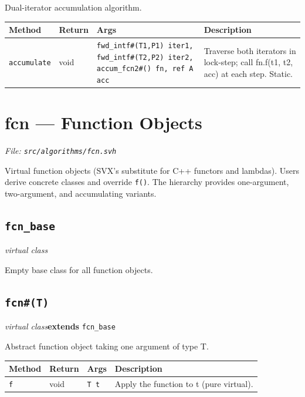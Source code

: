 \documentclass[11pt,letterpaper]{report}
\begin{document}
Dual-iterator accumulation algorithm.

\begin{xltabular}{\linewidth}{>{\small}p{1.35in} >{\small}p{1.25in} >{\small}p{0.95in} >{\small}X}
\toprule
\textbf{Method} & \textbf{Return} & \textbf{Args} & \textbf{Description} \\
\midrule
\endhead
\bottomrule
\endfoot
\texttt{accumulate} & void & \texttt{fwd\_intf\#(T1,P1) iter1, fwd\_intf\#(T2,P2) iter2, accum\_fcn2\#() fn, ref A acc} & Traverse both iterators in lock-step; call fn.f(t1, t2, acc) at each step. Static. \\
\end{xltabular}

\section{fcn --- Function Objects}
\noindent\small\textit{File: \texttt{src/algorithms/fcn.svh}}\par

Virtual function objects (SVX's substitute for C++ functors and lambdas). Users derive concrete classes and override \texttt{f()}. The hierarchy provides one-argument, two-argument, and accumulating variants.

\subsection*{\texttt{fcn\_base}}
\noindent\small\textit{virtual class}\par

Empty base class for all function objects.


\subsection*{\texttt{fcn\#(T)}}
\noindent\small\textit{virtual class}\quad \textbf{extends} \texttt{fcn\_base}\par

Abstract function object taking one argument of type T.

\begin{xltabular}{\linewidth}{>{\small}p{1.35in} >{\small}p{1.25in} >{\small}p{0.95in} >{\small}X}
\toprule
\textbf{Method} & \textbf{Return} & \textbf{Args} & \textbf{Description} \\
\midrule
\endhead
\bottomrule
\endfoot
\texttt{f} & void & \texttt{T t} & Apply the function to t (pure virtual). \\
\end{xltabular}
\end{document}
